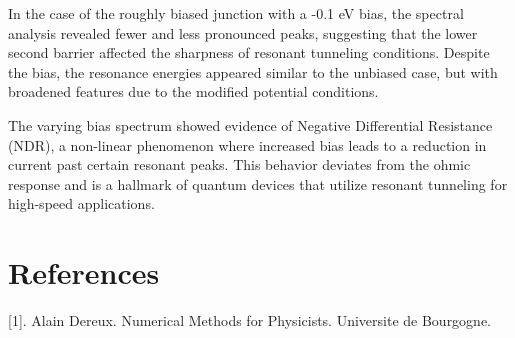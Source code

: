 \documentclass[twocolumn]{article}[ht]
\begin{document}
In the case of the roughly biased junction with a -0.1 eV bias, the spectral analysis revealed fewer and less pronounced peaks, suggesting that the lower second barrier affected the sharpness of resonant tunneling conditions. Despite the bias, the resonance energies appeared similar to the unbiased case, but with broadened features due to the modified potential conditions.

The varying bias spectrum showed evidence of Negative Differential Resistance (NDR), a non-linear phenomenon where increased bias leads to a reduction in current past certain resonant peaks. This behavior deviates from the ohmic response and is a hallmark of quantum devices that utilize resonant tunneling for high-speed applications.

\section{References}
[1]. Alain Dereux. Numerical Methods for Physicists. Universite de Bourgogne.
\end{document}
